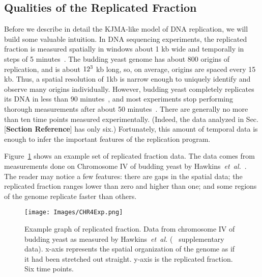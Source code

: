 	
		\subsection{Qualities of the Replicated Fraction}
		\label{subsec:QualitiesReplicatedFraction}
		
		Before we describe in detail the KJMA-like model of DNA replication, we will build some valuable intuition.
		In DNA sequencing experiments, the replicated fraction is measured spatially in windows about 1 kb wide and temporally in steps of 5 minutes~\cite{StochasticTermination}.
		The budding yeast genome has about 800 origins of replication, and is about $12\time10^3$ kb long, so, on average, origins are spaced every 15 kb.
		Thus, a spatial resolution of 1kb is narrow enough to uniquely identify and observe many origins individually. 
		However, budding yeast completely replicates its DNA in less than 90 minutes~\cite{DeepSeq}, and most experiments stop performing thorough measurements after about 50 minutes~\cite{StochasticTermination,DeepSeq,McCuneMicroArray}.
		There are generally no more than ten time points measured experimentally.
		(Indeed, the data analyzed in Sec. [\textbf{Section Reference}] has only six.)
		Fortunately, this amount of temporal data is enough to infer the important features of the replication program.
		
		Figure~\ref{fig:ReplicatedFractionExample} shows an example set of replicated fraction data.
		The data comes from measurements done on Chromosome IV of budding yeast by Hawkins~\emph{et~al.}~\cite{StochasticTermination}.
		The reader may notice a few features:
		there are gaps in the spatial data;
		the replicated fraction ranges lower than zero and higher than one;
		and some regions of the genome replicate faster than others.
		
		\begin{figure}[tbh]
			\begin{center}
				\texttt{[image: Images/CHR4Exp.png]}
			\end{center}
				\caption[Budding yeast Chromosome IV replicated fraction]{\label{fig:ReplicatedFractionExample} Example graph of replicated fraction.
					Data from chromosome IV of budding yeast as measured by Hawkins~\emph{et~al.} (~\cite{StochasticTermination} supplementary data).
					x-axis represents the spatial organization of the genome as if it had been stretched out straight.
					y-axis is the replicated fraction.
					Six time points.
				}
		\end{figure}
		
